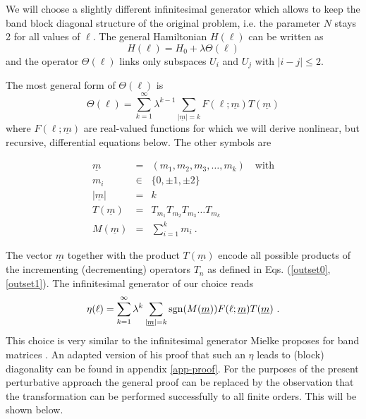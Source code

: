 We will choose a slightly
different infinitesimal generator which allows to
keep the band block diagonal structure of the original problem, i.e.
the parameter $N$ stays 2 for all values of $\ell$. The general
Hamiltonian $H(\ell)$ can be written as
\begin{equation}
\label{hamdef}
H(\ell) = H_0+\lambda \Theta(\ell)
\end{equation}
and the operator $\Theta(\ell)$ links only subspaces $U_i$ and
$U_j$ with $|i-j|\leq 2$.

The most general form of $\Theta(\ell)$ is
\begin{equation}
\label{thetadef}
\Theta(\ell) = \sum_{k=1}^{\infty}\lambda^{k-1}
\sum_{ |\underline{m}|=k }
F(\ell;\underline{m}) T(\underline{m})
\end{equation}
where $F(\ell;\underline{m})$ are real-valued functions
for which we will derive nonlinear, but recursive, differential equations
below. The other symbols are
\begin{mathletters}
\begin{eqnarray}
\underline{m} &=& (m_1,m_2,m_3,\ldots,m_k)\quad\mbox{with}\\\label{m_menge}
 m_i &\in& \{ 0,\pm1,\pm2\}\\\label{m_betrag}
|\underline{m}| &=& k \\
T(\underline{m}) &=& T_{m_1}T_{m_2}T_{m_3}\ldots T_{m_k}\\
M(\underline{m}) &=& \sum_{i=1}^k m_i \ .
\end{eqnarray}
\end{mathletters}
The vector $\underline{m}$ together with the product $T(\underline{m})$
encode all possible products of the incrementing (decrementing)
operators $T_n$ as defined in Eqs. (\ref{outset0},\ref{outset1}).
The infinitesimal generator of our choice reads
\begin{equation}
\label{infgen}
\eta(\ell) = \sum_{k=1}^\infty\lambda^k
\sum_{|\underline{m}|=k} {\rm sgn}(M(\underline{m}))
F(\ell;\underline{m}) T(\underline{m})\ .
\end{equation}
This choice is very similar
to the infinitesimal generator Mielke proposes
for band matrices \cite{mielk98}. An adapted version of
his proof that such an $\eta$ leads to (block) diagonality can be found
in appendix \ref{app-proof}. For the purposes of the present perturbative
approach the general proof can be replaced by the observation
that the transformation can be performed successfully to all finite
orders. This will be shown below.


